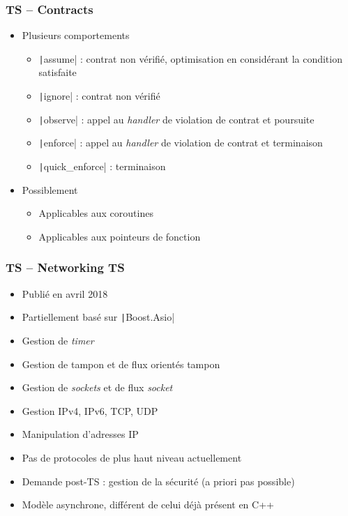 \documentclass[C++.tex]{subfiles}
\begin{document}
\begin{frame}[fragile]
\frametitle{TS -- Contracts}
	\begin{itemize}
		\item Plusieurs comportements
		\begin{itemize}
			\item \texttt|assume| : contrat non vérifié, optimisation en considérant la condition satisfaite
			\item \texttt|ignore| : contrat non vérifié
			\item \texttt|observe| : appel au \textit{handler} de violation de contrat et poursuite
			\item \texttt|enforce| : appel au \textit{handler} de violation de contrat et terminaison
			\item \texttt|quick_enforce| : terminaison

		\end{itemize}

		\item Possiblement
		\begin{itemize}
			\item Applicables aux coroutines
			\item Applicables aux pointeurs de fonction
		\end{itemize}
	\end{itemize}

\end{frame}

\begin{frame}[fragile]
	\frametitle{TS -- Networking TS}
	\begin{itemize}
		\item Publié en avril 2018
		\item Partiellement basé sur \texttt|Boost.Asio|
		\item Gestion de \textit{timer}
		\item Gestion de tampon et de flux orientés tampon
		\item Gestion de \textit{sockets} et de flux \textit{socket}
		\item Gestion IPv4, IPv6, TCP, UDP
		\item Manipulation d'adresses IP
		\item Pas de protocoles de plus haut niveau actuellement
		\item Demande post-TS : gestion de la sécurité (a priori pas possible)
		\item Modèle asynchrone, différent de celui déjà présent en C++
	\end{itemize}

\end{frame}
\end{document}
